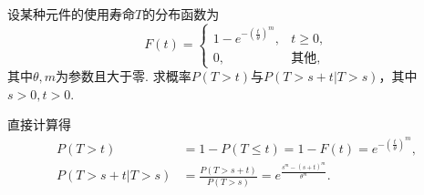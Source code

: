 \begin{example}
设某种元件的使用寿命\(T\)的分布函数为\begin{equation*}
	F(t) = \left\{ \begin{array}{cl}
		1 - e^{-\left( \frac{t}\theta \right)^m}, & t \geq 0, \\
		0, & \text{其他},
	\end{array} \right.
\end{equation*}
其中\(\theta,m\)为参数且大于零.
求概率\(P(T>t)\)与\(P(T>s+t \vert T>s)\)，其中\(s>0,t>0\).
\begin{solution}
直接计算得\begin{align*}
	P(T>t)
	&= 1 - P(T \leq t)
	= 1 - F(t)
	= e^{-\left( \frac{t}\theta \right)^m}, \\
	P(T>s+t \vert T>s)
	&= \frac{P(T>s+t)}{P(T>s)}
	= e^{\frac{s^m - (s+t)^m}{\theta^m}}.
\end{align*}
\end{solution}
\end{example}
